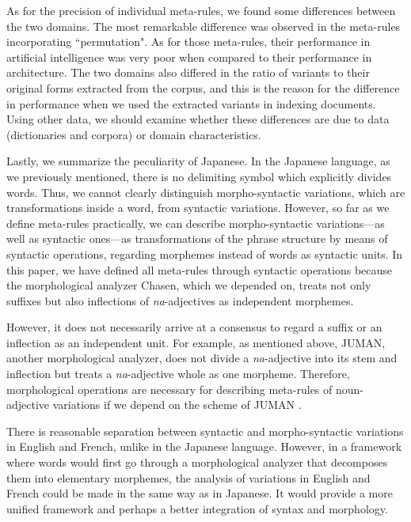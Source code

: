 As for the precision of individual meta-rules, we found some differences between the two domains. The most remarkable difference was observed in the meta-rules incorporating ``permutation". As for those meta-rules, their performance in artificial intelligence was very poor when compared to their performance in architecture. The two domains also differed in the ratio of variants to their original forms extracted from the corpus, and this is the reason for the difference in performance when we used the extracted variants in indexing documents. Using other data, we should examine whether these differences are due to data (dictionaries and corpora) or domain characteristics.

Lastly, we summarize the peculiarity of Japanese. In the Japanese language, as we previously mentioned, there is no delimiting symbol which explicitly divides words. Thus, we cannot clearly distinguish morpho-syntactic variations, which are transformations inside a word, from syntactic variations. However, so far as we define meta-rules practically, we can describe morpho-syntactic variations---as well as syntactic ones---as transformations of the phrase structure by means of syntactic operations, regarding morphemes instead of words as syntactic units. In this paper, we have defined all meta-rules through syntactic operations because the morphological analyzer Chasen, which we depended on, treats not only suffixes but also inflections of {\it na}-adjectives as independent morphemes.

However, it does not necessarily arrive at a consensus to regard a suffix or an inflection as an independent unit. For example, as mentioned above, JUMAN, another morphological analyzer, does not divide a {\it na}-adjective into its stem and inflection but treats a {\it na}-adjective whole as one morpheme. Therefore, morphological operations are necessary for describing meta-rules of noun-adjective variations if we depend on the scheme of JUMAN \cite{Yoshikane}.

There is reasonable separation between syntactic and morpho-syntactic variations in English and French, unlike in the Japanese language. However, in a framework where words would first go through a morphological analyzer that decomposes them into elementary morphemes, the analysis of variations in English and French could be made in the same way as in Japanese. It would provide a more unified framework and perhaps a better integration of syntax and morphology.



\nocite{Shapiro}






